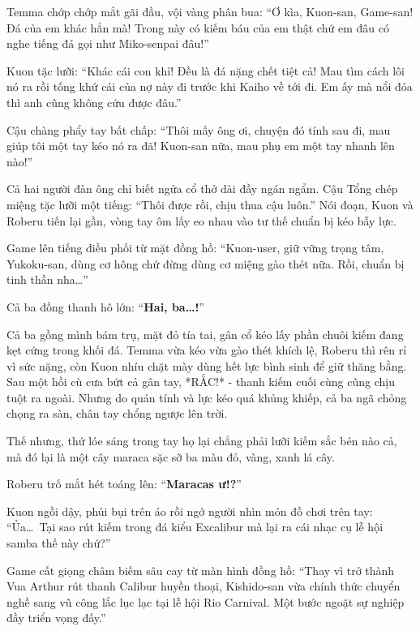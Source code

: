 \documentclass[../main.tex]{subfiles}
\begin{document}
Temma chớp chớp mắt gãi đầu, vội vàng phân bua: ``Ơ kìa, Kuon-san, Game-san! Đá của em khác hẳn mà! Trong này có kiếm báu của em thật chứ em đâu có nghe tiếng đá gọi như Miko-senpai đâu!''

Kuon tặc lưỡi: ``Khác cái con khỉ! Đều là đá nặng chết tiệt cả! Mau tìm cách lôi nó ra rồi tống khứ cái của nợ này đi trước khi Kaiho về tới đi. Em ấy mà nổi đóa thì anh cũng không cứu được đâu.''

Cậu chàng phẩy tay bất chấp: ``Thôi mấy ông ơi, chuyện đó tính sau đi, mau giúp tôi một tay kéo nó ra đã! Kuon-san nữa, mau phụ em một tay nhanh lên nào!''

Cả hai người đàn ông chỉ biết ngửa cổ thở dài đầy ngán ngẩm. Cậu Tổng chép miệng tặc lưỡi một tiếng: ``Thôi được rồi, chịu thua cậu luôn.'' Nói đoạn, Kuon và Roberu tiến lại gần, vòng tay ôm lấy eo nhau vào tư thế chuẩn bị kéo bẫy lực.

Game lên tiếng điều phối từ mặt đồng hồ: ``Kuon-user, giữ vững trọng tâm, Yukoku-san, dùng cơ hông chứ đừng dùng cơ miệng gào thét nữa. Rồi, chuẩn bị tinh thần nha\dots''

Cả ba đồng thanh hô lớn: ``\textbf{Hai, ba\dots!}''


Cả ba gồng mình bám trụ, mặt đỏ tía tai, gân cổ kéo lấy phần chuôi kiếm đang kẹt cứng trong khối đá. Temma vừa kéo vừa gào thét khích lệ, Roberu thì rên rỉ vì sức nặng, còn Kuon nhíu chặt mày dùng hết lực bình sinh để giữ thăng bằng. Sau một hồi cù cưa bứt cả gân tay, *RẮC!* - thanh kiếm cuối cùng cũng chịu tuột ra ngoài. Nhưng do quán tính và lực kéo quá khủng khiếp, cả ba ngã chỏng chọng ra sàn, chân tay chổng ngược lên trời.

Thế nhưng, thứ lóe sáng trong tay họ lại chẳng phải lưỡi kiếm sắc bén nào cả, mà đó lại là một cây maraca sặc sỡ ba màu đỏ, vàng, xanh lá cây.

Roberu trố mắt hét toáng lên: ``\textbf{Maracas ư!?}''


Kuon ngồi dậy, phủi bụi trên áo rồi ngớ người nhìn món đồ chơi trên tay: ``Ủa\dots\ Tại sao rút kiếm trong đá kiểu Excalibur mà lại ra cái nhạc cụ lễ hội samba thế này chứ?''

Game cất giọng châm biếm sâu cay từ màn hình đồng hồ: ``Thay vì trở thành Vua Arthur rút thanh Calibur huyền thoại, Kishido-san vừa chính thức chuyển nghề sang vũ công lắc lục lạc tại lễ hội Rio Carnival. Một bước ngoặt sự nghiệp đầy triển vọng đấy.''
\end{document}
